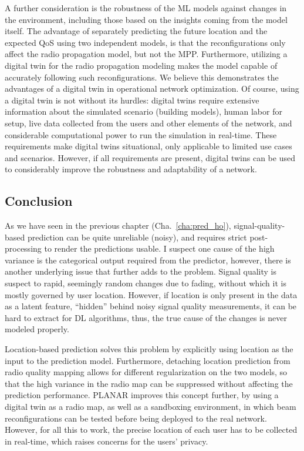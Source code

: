 			A further consideration is the robustness of the \ac{ML} models against changes in the environment, including those based on the insights coming from the model itself.
			The advantage of separately predicting the future location and the expected \ac{QoS} using two independent models, is that the reconfigurations only affect the radio propagation model, but not the \ac{MPP}.
			Furthermore, utilizing a digital twin for the radio propagation modeling makes the model capable of accurately following such reconfigurations.
			We believe this demonstrates the advantages of a digital twin in operational network optimization.
			Of course, using a digital twin is not without its hurdles: digital twins require extensive information about the simulated scenario (building models), human labor for setup, live data collected from the users and other elements of the network, and considerable computational power to run the simulation in real-time.
			These requirements make digital twins situational, only applicable to limited use cases and scenarios.
			However, if all requirements are present, digital twins can be used to considerably improve the robustness and adaptability of a network.
			
		\subsection{Conclusion}
		
			As we have seen in the previous chapter (Cha.~\ref{cha:pred_ho}), signal-quality-based prediction can be quite unreliable (noisy), and requires strict post-processing to render the predictions usable.
			I suspect one cause of the high variance is the categorical output required from the predictor, however, there is another underlying issue that further adds to the problem.
			Signal quality is suspect to rapid, seemingly random changes due to fading, without which it is mostly governed by user location.
			However, if location is only present in the data as a latent feature, ``hidden'' behind noisy signal quality measurements, it can be hard to extract for \ac{DL} algorithms, thus, the true cause of the changes is never modeled properly.
			
			Location-based prediction solves this problem by explicitly using location as the input to the prediction model.
			Furthermore, detaching location prediction from radio quality mapping allows for different regularization on the two models, so that the high variance in the radio map can be suppressed without affecting the prediction performance.
			\ac{PLANAR} improves this concept further, by using a digital twin as a radio map, as well as a sandboxing environment, in which beam reconfigurations can be tested before being deployed to the real network.
			However, for all this to work, the precise location of each user has to be collected in real-time, which raises concerns for the users' privacy.
		
